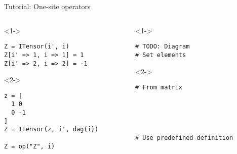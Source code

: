 \begin{frame}[fragile]{Tutorial: One-site operators}

\begin{columns}

\begin{column}{4.5cm}

\begin{onlyenv}<1->

\begin{lstlisting}[language=JuliaLocal, style=julia, basicstyle=\small]
Z = ITensor(i', i)
Z[i' => 1, i => 1] = 1
Z[i' => 2, i => 2] = -1
\end{lstlisting}

\end{onlyenv}

\begin{onlyenv}<2->

\begin{lstlisting}[language=JuliaLocal, style=julia, basicstyle=\small]
z = [
  1 0
  0 -1
]
Z = ITensor(z, i', dag(i))

Z = op("Z", i)
\end{lstlisting}

\end{onlyenv}

\end{column}

\begin{column}{4.5cm}

\begin{onlyenv}<1->

\begin{lstlisting}[style=julia, numbers=none, mathescape, basicstyle=\small]
# TODO: Diagram
# Set elements
 \end{lstlisting}

\end{onlyenv}

\begin{onlyenv}<2->

\begin{lstlisting}[style=julia, numbers=none, mathescape, basicstyle=\small]
# From matrix





# Use predefined definition
\end{lstlisting}

\end{onlyenv}

\end{column}

\end{columns}

\end{frame}
